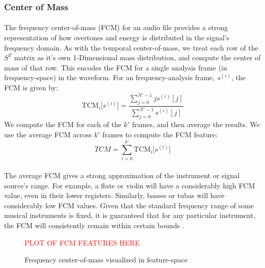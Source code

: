 \documentclass[12pt,letterpaper]{article}
\begin{document}


\subsubsection{Center of Mass}

\paragraph*{}The frequency center-of-mass (FCM) for an audio file provides a strong representation of how overtones and energy is distributed in the signal's frequency domain. As with the temporal center-of-mass, we treat each row of the $S^T$ matrix as it's own 1-Dimensional mass distribution, and compute the center of mass of that row. This encodes the FCM for a single analysis frame (in frequency-space) in the waveform. For an frequency-analysis frame, $s^{(i)}$, the FCM is given by:
\begin{equation}
\label{eqn-FeatureFCM}
\text{TCM}_{i}\big[ s^{(i)} \big] = \frac{\sum_{j=0}^{N'-1}j s^{(i)}[j]}{\sum_{j=0}^{N'-1}s^{(i)}[j]}
\end{equation}
We compute the FCM for each of the $k'$ frames, and then average the results. We use the average FCM across $k'$ frames to compute the FCM feature:
\begin{equation}
TCM = \sum_{i=0}^{k'} \text{TCM}_{i}\big[ s^{(i)} \big]
\end{equation}

\paragraph*{}The average FCM gives a strong approximation of the instrument or signal source's range. For example, a flute or violin will have a considerably high FCM value, even in their lower registers. Similarly, basses or tubas will have considerably low FCM values. Given that the standard frequency range of some musical instruments is fixed, it is guaranteed that for any particular instrument, the FCM will consistently remain within certain bounds \cite{Olson,White}.

\begin{figure}[H]
\label{fig-FeatureFCM}
\begin{center}
\textcolor{red}{PLOT OF FCM FEATURES HERE}
\end{center}
\caption{Frequency center-of-mass visualized in feature-space}
\end{figure}
\end{document}
